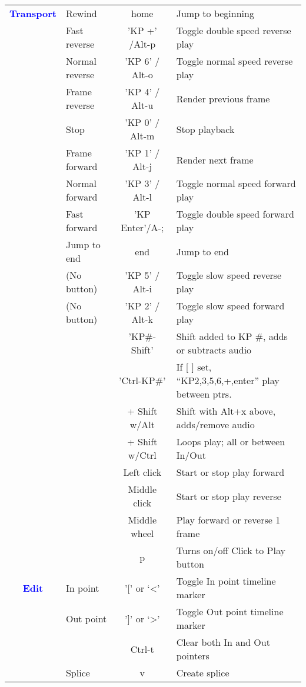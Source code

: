 \begin{center}
\begin{longtable}{ >{\bfseries}c l c p{6cm}}
        \textcolor{blue}{Transport} & Rewind & home & Jump to beginning \\        
        & Fast reverse & 'KP +' /Alt-p & Toggle double speed reverse play \\        
        & Normal reverse & 'KP 6' / Alt-o & Toggle normal speed reverse play \\        
        & Frame reverse & 'KP 4' / Alt-u & Render previous frame \\        
        & Stop & 'KP 0' / Alt-m & Stop playback \\        
        & Frame forward & 'KP 1' / Alt-j & Render next frame \\        
        & Normal forward & 'KP 3' / Alt-l & Toggle normal speed forward play \\        
        & Fast forward & 'KP Enter'/A-; & Toggle double speed forward play \\        
        & Jump to end & end & Jump to end \\        
        & (No button) & 'KP 5' / Alt-i & Toggle slow speed reverse play \\        
        & (No button) & 'KP 2' / Alt-k & Toggle slow speed forward play \\        
        &  & 'KP\#-Shift’ & Shift added to KP \#, adds or subtracts audio \\        
        &  & 'Ctrl-KP\#’ & If [ ] set, “KP2,3,5,6,+,enter” play between ptrs. \\        
        &  & + Shift w/Alt & Shift with Alt+x above, adds/remove audio \\        
        &  & + Shift w/Ctrl & Loops play; all or between In/Out \\        
        &  & Left click & Start or stop play forward \\        
        &  & Middle click & Start or stop play reverse \\        
        &  & Middle wheel & Play forward or reverse 1 frame \\        
        &  & p & Turns on/off Click to Play button \\
        \midrule
        \textcolor{blue}{Edit} & In point & '[' or ‘<’ & Toggle In point timeline marker\\        
        & Out point & ']' or ‘>’ & Toggle Out point timeline marker \\        
        &  & Ctrl-t & Clear both In and Out pointers \\        
        & Splice & v & Create splice \\        

\end{longtable}
\end{center}
